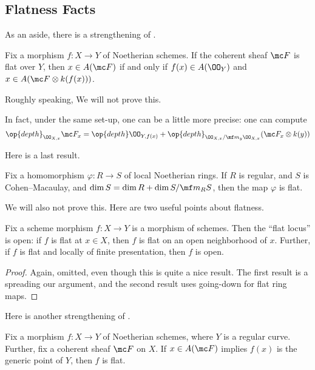 \documentclass[../notes.tex]{subfiles}
\begin{document}
\subsection{Flatness Facts}
As an aside, there is a strengthening of .
\begin{proposition}
	Fix a morphism $f\colon X\to Y$ of Noetherian schemes. If the coherent sheaf $\mc F$ is flat over $Y$, then $x\in A(\mc F)$ if and only if $f(x)\in A(\OO_Y)$ and $x\in A(\mc F\otimes k(f(x)))$.
\end{proposition}
Roughly speaking, We will not prove this.
\begin{remark}
	In fact, under the same set-up, one can be a little more precise: one can compute
	\[\op{depth}_{\OO_{X,x}}\mc F_x=\op{depth}\OO_{Y,f(x)}+\op{depth}_{\OO_{X,x}/\mf m_y\OO_{X,x}}(\mc F_x\otimes k(y))\]
\end{remark}
Here is a last result.
\begin{theorem}
	Fix a homomorphism $\varphi\colon R\to S$ of local Noetherian rings. If $R$ is regular, and $S$ is Cohen--Macaulay, and $\dim S=\dim R+\dim S/\mf m_RS$, then the map $\varphi$ is flat.
\end{theorem}
We will also not prove this. Here are two useful points about flatness.
\begin{proposition}
	Fix a scheme morphism $f\colon X\to Y$ is a morphism of schemes. Then the ``flat locus'' is open: if $f$ is flat at $x\in X$, then $f$ is flat on an open neighborhood of $x$. Further, if $f$ is flat and locally of finite presentation, then $f$ is open.
\end{proposition}
\begin{proof}
	Again, omitted, even though this is quite a nice result. The first result is a spreading our argument, and the second result uses going-down for flat ring maps.
\end{proof}
Here is another strengthening of .
\begin{proposition}
	Fix a morphism $f\colon X\to Y$ of Noetherian schemes, where $Y$ is a regular curve. Further, fix a coherent sheaf $\mc F$ on $X$. If $x\in A(\mc F)$ implies $f(x)$ is the generic point of $Y$, then $f$ is flat.
\end{proposition}
\end{document}
